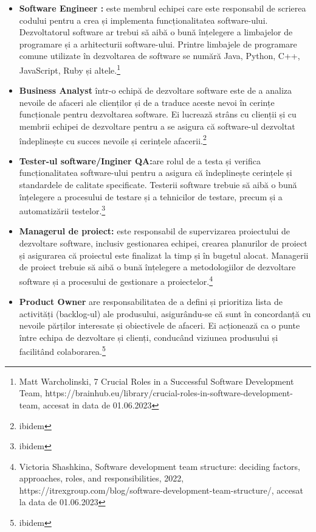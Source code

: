 \documentclass[a4paper, 12pt]{article}
\begin{document}
\begin{itemize}
	\item \textbf{Software Engineer :} este membrul echipei care este responsabil de scrierea codului pentru a crea și implementa funcționalitatea software-ului. Dezvoltatorul software ar trebui să aibă o bună înțelegere a limbajelor de programare și a arhitecturii software-ului. Printre limbajele de programare comune utilizate în dezvoltarea de software se numără Java, Python, C++, JavaScript, Ruby și altele.\footnote{Matt Warcholinski, 7 Crucial Roles in a Successful Software Development Team, https://brainhub.eu/library/crucial-roles-in-software-development-team, accesat in data de 01.06.2023}

	\item \textbf{Business Analyst} într-o echipă de dezvoltare software este de a analiza nevoile de afaceri ale clienților și de a traduce aceste nevoi în cerințe funcționale pentru dezvoltarea software. Ei lucrează strâns cu clienții și cu membrii echipei de dezvoltare pentru a se asigura că software-ul dezvoltat îndeplinește cu succes nevoile și cerințele afacerii.\footnote{ibidem}

	\item \textbf{ Tester-ul software/Inginer QA:}are rolul de a testa și verifica funcționalitatea software-ului pentru a asigura că îndeplinește cerințele și standardele de calitate specificate. Testerii software trebuie să aibă o bună înțelegere a procesului de testare și a tehnicilor de testare, precum și a automatizării testelor.\footnote{ibidem}

	\item \textbf{ Managerul de proiect:}  este responsabil de supervizarea proiectului de dezvoltare software, inclusiv gestionarea echipei, crearea planurilor de proiect și asigurarea că proiectul este finalizat la timp și în bugetul alocat. Managerii de proiect trebuie să aibă o bună înțelegere a metodologiilor de dezvoltare software și a procesului de gestionare a proiectelor.\footnote{Victoria Shashkina, Software development team structure: deciding factors, approaches, roles, and responsibilities, 2022, https://itrexgroup.com/blog/software-development-team-structure/, accesat la data de 01.06.2023}

	\item\textbf{Product Owner} are responsabilitatea de a defini și prioritiza lista de activități (backlog-ul) ale produsului, asigurându-se că sunt în concordanță cu nevoile părților interesate și obiectivele de afaceri. Ei acționează ca o punte între echipa de dezvoltare și clienți, conducând viziunea produsului și facilitând colaborarea.\footnote{ibidem}
	

\end{itemize}
\end{document}
